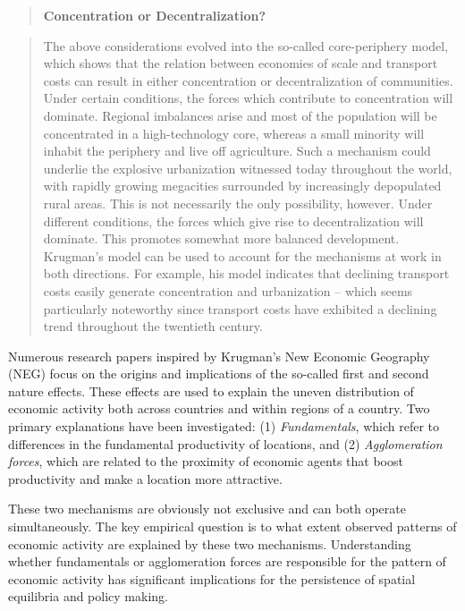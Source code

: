 \documentclass[
  12pt,
  oneside]{book}
\theoremstyle{definition}
\theoremstyle{definition}
\theoremstyle{definition}
\theoremstyle{definition}
\theoremstyle{remark}
\begin{document}
\begin{quote}
\textbf{Concentration or Decentralization?}
\end{quote}

\begin{quote}
The above considerations evolved into the so-called core-periphery model, which shows that the relation between economies of scale and transport costs can result in either concentration or decentralization of communities. Under certain conditions, the forces which contribute to concentration will dominate. Regional imbalances arise and most of the population will be concentrated in a high-technology core, whereas a small minority will inhabit the periphery and live off agriculture. Such a mechanism could underlie the explosive urbanization witnessed today throughout the world, with rapidly growing megacities surrounded by increasingly depopulated rural areas. This is not necessarily the only possibility, however. Under different conditions, the forces which give rise to decentralization will dominate. This promotes somewhat more balanced development. Krugman's model can be used to account for the mechanisms at work in both directions. For example, his model indicates that declining transport costs easily generate concentration and urbanization -- which seems particularly noteworthy since transport costs have exhibited a declining trend throughout the twentieth century.
\end{quote}

Numerous research papers inspired by Krugman's New Economic Geography (NEG) focus on the origins and implications of the so-called first and second nature effects. These effects are used to explain the uneven distribution of economic activity both across countries and within regions of a country. Two primary explanations have been investigated: (1) \emph{Fundamentals}, which refer to differences in the fundamental productivity of locations, and (2) \emph{Agglomeration forces}, which are related to the proximity of economic agents that boost productivity and make a location more attractive.

These two mechanisms are obviously not exclusive and can both operate simultaneously. The key empirical question is to what extent observed patterns of economic activity are explained by these two mechanisms. Understanding whether fundamentals or agglomeration forces are responsible for the pattern of economic activity has significant implications for the persistence of spatial equilibria and policy making.
\end{document}

